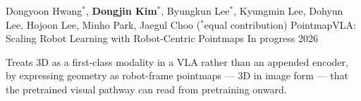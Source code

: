 
\begin{cventries}

  \cventry
    {Dongyoon Hwang$^*$, \textbf{Dongjin Kim}$^*$, Byungkun Lee$^*$, Kyungmin Lee, Dohyun Lee, Hojoon Lee, Minho Park, Jaegul Choo \quad ($^*$equal contribution)}
    {PointmapVLA: Scaling Robot Learning with Robot-Centric Pointmaps}
    {In progress}
    {2026}
    {%
      \begin{cvitems}
        \item Treats 3D as a first-class modality in a VLA rather than an appended encoder, by expressing geometry as robot-frame pointmaps --- 3D in image form --- that the pretrained visual pathway can read from pretraining onward.
      \end{cvitems}
    }

\end{cventries}
